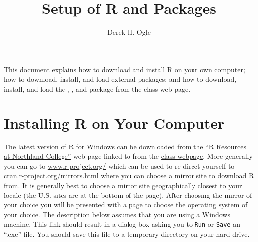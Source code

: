 \documentclass[a4paper]{article}
\begin{document}
\title{Setup of R and Packages}
\author{Derek H. Ogle}
\date{}  %
\maketitle

This document explains how to download and install R on your own computer; how to download, install, and load external packages; and how to download, install, and load the , , and  package from the class web page.

\section{Installing R on Your Computer} \label{sect:RInstall}
The latest version of R for Windows can be downloaded from the \href{http://www.ncfaculty.net/dogle/R/R.html}{``R Resources at Northland College''} web page linked to from the \href{http://fwcb.cfans.umn.edu/courses/fisheryupdate/}{class webpage}.  More generally you can go to \href{http://www.r-project.org/index.html}{www.r-project.org/} which can be used to re-direct yourself to \href{http://cran.r-project.org/mirrors.html}{cran.r-project.org/mirrors.html} where you can choose a mirror site to download R from.  It is generally best to choose a mirror site geographically closest to your locale (the U.S. sites are at the bottom of the page).  After choosing the mirror of your choice you will be presented with a page to choose the operating system of your choice.  The description below assumes that you are using a Windows machine.  This link should result in a dialog box asking you to \verb"Run" or \verb"Save" an ``.exe'' file.  You should save this file to a temporary directory on your hard drive.
\end{document}
